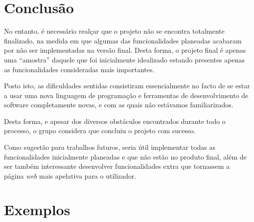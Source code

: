 \documentclass[11pt,a4paper]{report}
\begin{document}
\chapter{Conclusão}

No entanto, é necessário realçar que o projeto não se encontra totalmente finalizado, na medida em que algumas das funcionalidades planeadas acabaram por não ser implementadas na versão final. Desta forma, o projeto final é apenas uma “amostra” daquele que foi inicialmente idealizado estando presentes apenas as funcionalidades consideradas mais importantes.

Posto isto, as dificuldades sentidas consistiram essencialmente no facto de se estar a usar uma nova linguagem de programação e ferramentas de desenvolvimento de software completamente novas, e com as quais não estávamos familiarizados.

Desta forma, e apesar dos diversos obstáculos encontrados durante todo o processo, o grupo considera que concluiu o projeto com sucesso.

Como sugestão para trabalhos futuros, seria útil implementar todas as funcionalidades inicialmente planeadas e que não estão no produto final, além de ser também interessante desenvolver funcionalidades extra que tornassem a página \emph{web} mais apelativa para o utilizador.

\appendix
\chapter{Exemplos}
\end{document}
